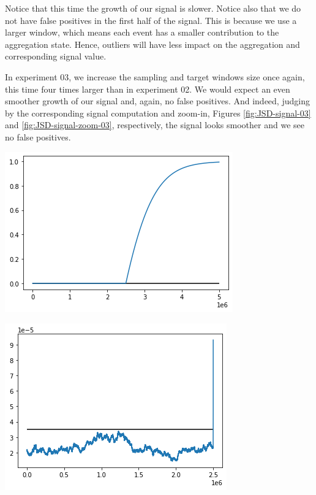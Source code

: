 Notice that this time the growth of our signal is slower. Notice also that we do not have false positives in the first half of the signal. This is because we use a larger window, which means each event has a smaller contribution to the aggregation state. Hence, outliers will have less impact on the aggregation and corresponding signal value.

In experiment 03, we increase the sampling and target windows size once again, this time four times larger than in experiment 02. We would expect an even smoother growth of our signal and, again, no false positives. And indeed, judging by the corresponding signal computation and zoom-in, Figures \ref{fig:JSD-signal-03} and \ref{fig:JSD-signal-zoom-03}, respectively, the signal looks smoother and we see no false positives.
\begin{center}
\begin{minipage}{.5\textwidth}
  \centering
  \includegraphics[width=1\linewidth]{figures/stream-analysis-viz-250000.png}
  \label{fig:JSD-signal-03}
\end{minipage}%
\begin{minipage}{.5\textwidth}
  \centering
  \includegraphics[width=1\linewidth]{figures/stream-analysis-viz-zoom-250000.png}
  \label{fig:JSD-signal-zoom-03}
\end{minipage}
\end{center}

